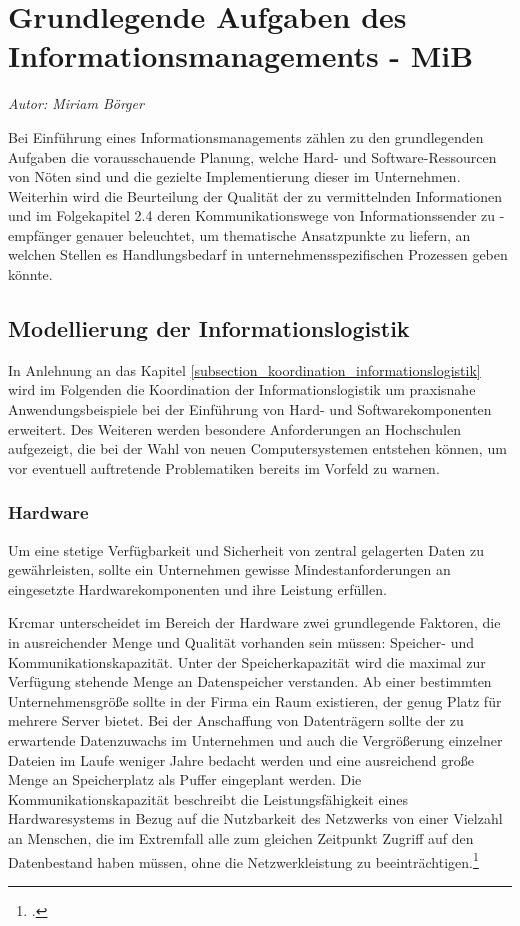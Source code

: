 \section{Grundlegende Aufgaben des Informationsmanagements - MiB}
\textit{Autor: Miriam Börger}

Bei Einführung eines Informationsmanagements zählen zu den grundlegenden Aufgaben die 
vorausschauende Planung, welche Hard- und Software-Ressourcen von Nöten sind und die 
gezielte Implementierung dieser im Unternehmen. Weiterhin wird die Beurteilung der Qualität 
der zu vermittelnden Informationen und im Folgekapitel 2.4 deren Kommunikationswege von 
Informationssender zu -empfänger genauer beleuchtet, um thematische Ansatzpunkte zu 
liefern, an welchen Stellen es Handlungsbedarf in unternehmensspezifischen Prozessen 
geben könnte. 

\subsection{Modellierung der Informationslogistik}
In Anlehnung an das Kapitel \ref{subsection_koordination_informationslogistik} wird im Folgenden die Koordination der 
Informationslogistik um praxisnahe Anwendungsbeispiele bei der Einführung von Hard- und 
Softwarekomponenten erweitert. Des Weiteren werden besondere Anforderungen an 
Hochschulen aufgezeigt, die bei der Wahl von neuen Computersystemen entstehen können, 
um vor eventuell auftretende Problematiken bereits im Vorfeld zu warnen.

\subsubsection{Hardware}
Um eine stetige Verfügbarkeit und Sicherheit von zentral gelagerten Daten zu gewährleisten, 
sollte ein Unternehmen gewisse Mindestanforderungen an eingesetzte Hardwarekomponenten 
und ihre Leistung erfüllen. 

Krcmar unterscheidet im Bereich der Hardware zwei grundlegende Faktoren, die in ausreichender 
Menge und Qualität vorhanden sein müssen: Speicher- und Kommunikationskapazität. Unter der 
Speicherkapazität wird die maximal zur Verfügung stehende Menge an Datenspeicher verstanden. 
Ab einer bestimmten Unternehmensgröße sollte in der Firma ein Raum existieren, der genug Platz 
für mehrere Server bietet. Bei der Anschaffung von Datenträgern sollte der zu erwartende 
Datenzuwachs im Unternehmen und auch die Vergrößerung einzelner Dateien im Laufe weniger Jahre 
bedacht werden und eine ausreichend große Menge an Speicherplatz als Puffer eingeplant werden. 
Die Kommunikationskapazität beschreibt die Leistungsfähigkeit eines Hardwaresystems in Bezug auf 
die Nutzbarkeit des Netzwerks von einer Vielzahl an Menschen, die im Extremfall alle zum gleichen 
Zeitpunkt Zugriff auf den Datenbestand haben müssen, ohne die Netzwerkleistung zu 
beeinträchtigen.\footcite{krcmar_einfuhrung_2015}

